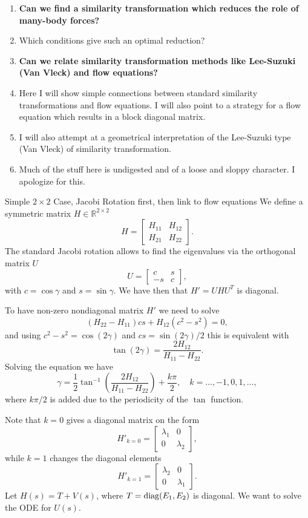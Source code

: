     \begin{enumerate}
\item {\bf Can we find a  similarity transformation which reduces the role of many-body forces?}
\item Which conditions give such an optimal reduction?
\item {\bf Can we relate similarity transformation methods like Lee-Suzuki (Van Vleck) and flow equations?}
\item Here I will show simple connections between standard similarity transformations and flow equations.
I will also point to a strategy for a flow equation  which results in a block diagonal matrix.
\item I will also attempt at a geometrical interpretation of the Lee-Suzuki type (Van Vleck) 
of similarity transformation.
\item Much of the stuff here is undigested and of a loose and sloppy character. I apologize for this.
    \end{enumerate}

Simple $2\times 2$ Case, Jacobi Rotation first, then link to flow equations
We define a  symmetric matrix  $H\in {\mathbb{R}}^{2\times 2}$
\[ H = \begin{bmatrix} H_{11} & H_{12} \\ H_{21} & H_{22}
\end{bmatrix}. \]
The standard Jacobi rotation allows to find the eigenvalues via the orthogonal matrix
$U$ 
\[ U = \begin{bmatrix} c & s \\ -s & c
\end{bmatrix}, \]
with $c = \cos \gamma$ and $s = \sin \gamma$. We have then that  $H' = UHU^T$ is diagonal. 

To have non-zero nondiagonal matrix $H'$ we need to solve
\[ (H_{22} - H_{11})cs + H_{12}(c^2 - s^2) = 0, \]
and using $c^2-s^2 = \cos(2\gamma)$ and $cs = \sin(2\gamma)/2$
this is equivalent with 
\[ \tan(2\gamma) = \frac{2 H_{12}}{H_{11}-H_{22}}. \]
Solving the equation we have
\begin{equation} \gamma = \frac{1}{2} \tan^{-1} \left( \frac{2H_{12}}{H_{11}-H_{22}}
\right) + \frac{k\pi}{2}, \quad k=\ldots,-1,0,1,\ldots, \label{eq:0} \end{equation}
where $k\pi/2$ is added due to the periodicity of the $\tan$ function.

Note that  $k=0$ gives a diagonal matrix on the form
\begin{equation} H'_{k=0} = \begin{bmatrix} \lambda_1 & 0 \\ 0 & \lambda_2 \end{bmatrix},
\label{eq:1} \end{equation}
while  $k=1$ changes the diagonal elements  
\begin{equation} H'_{k=1} = \begin{bmatrix} \lambda_2 & 0 \\ 0 & \lambda_1 \end{bmatrix}.
\label{eq:2}\end{equation}
Let $H(s) = T + V(s)$, where $T= \mathrm{diag}(E_1,E_2)$ is diagonal. We want to solve the ODE 
for $U(s)$. 


